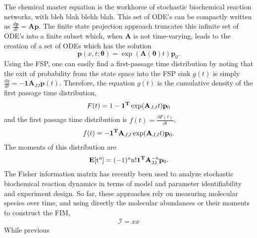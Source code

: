 \documentclass[aps,prl,preprint,groupedaddress]{revtex4-1}
\newcommand{\thv}{\boldsymbol{\theta}}
\newcommand{\Av}{\mathbf{A}}
\newcommand{\Tv}{\mathbf{T}}
\newcommand{\pv}{\mathbf{p}}
\newcommand{\Exp}{\rm{\mathbf{E}}}
\begin{document}
The chemical master equation \cite{xxx} is the workhorse of stochastic biochemical reaction networks, with bleh blah blehh blah.
This set of ODE's can be compactly written as $\frac{d \pv}{dt} = \Av \pv$. The finite state projection approach truncates this infinite set of ODE's into a finite subset which, when $\Av$ is not time-varying, leads to the creation of a set of ODEs which has the solution
\begin{equation}
  \pv(x,t;\thv) = \exp(\Av(\thv) t)\pv_0.
\end{equation}
Using the FSP, one can easily find a first-passage time distribution by noting that the exit of probability from the state space into the FSP sink $g(t)$ is simply $\frac{dg}{dt} = -\mathbf{1} {\Av_{JJ}} \pv(t)$.
Therefore, the equation $g(t)$ is the cumulative density of the first passage time distribution,
\begin{align}
    F(t) = 1 - \mathbf{1}^{\rm{\Tv}} \exp (\Av_{JJ}t) \pv_0
\end{align}
and the first passage time distribution is $ f(t) = \frac{\partial F(t)}{\partial{t}}$,
\begin{align}
    f(t) = -\mathbf{1}^{\rm{\Tv}} \Av_{JJ} \exp(\Av_{JJ}t) \pv_0.
\end{align}
The moments of this distribution are
\begin{align}
    \Exp [t^n] = (-1)^n n! \mathbf{1}^{\rm \Tv} \Av_{JJ}^{-n} \pv_0.
\end{align}
The Fisher information matrix has recently been used to analyze stochastic biochemical reaction dynamics \cite{xxx} in terms of model and parameter identifiability and experiment design. So far, these approaches rely on measuring molecular species over time, and using directly the molecular abundances or their moments to construct the FIM,
\begin{align}
  \mathcal{I} = xx
\end{align}
While previous
\end{document}
